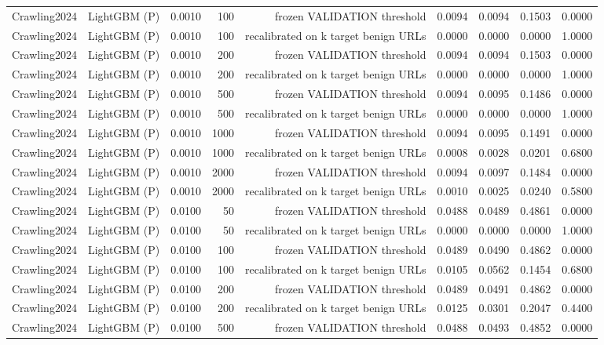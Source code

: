 \begin{table}[t]
\begin{tabular}{llrrrrrrr}
Crawling2024 & LightGBM (P) & 0.0010 & 100 & frozen VALIDATION threshold & 0.0094 & 0.0094 & 0.1503 & 0.0000 \\
Crawling2024 & LightGBM (P) & 0.0010 & 100 & recalibrated on k target benign URLs & 0.0000 & 0.0000 & 0.0000 & 1.0000 \\
Crawling2024 & LightGBM (P) & 0.0010 & 200 & frozen VALIDATION threshold & 0.0094 & 0.0094 & 0.1503 & 0.0000 \\
Crawling2024 & LightGBM (P) & 0.0010 & 200 & recalibrated on k target benign URLs & 0.0000 & 0.0000 & 0.0000 & 1.0000 \\
Crawling2024 & LightGBM (P) & 0.0010 & 500 & frozen VALIDATION threshold & 0.0094 & 0.0095 & 0.1486 & 0.0000 \\
Crawling2024 & LightGBM (P) & 0.0010 & 500 & recalibrated on k target benign URLs & 0.0000 & 0.0000 & 0.0000 & 1.0000 \\
Crawling2024 & LightGBM (P) & 0.0010 & 1000 & frozen VALIDATION threshold & 0.0094 & 0.0095 & 0.1491 & 0.0000 \\
Crawling2024 & LightGBM (P) & 0.0010 & 1000 & recalibrated on k target benign URLs & 0.0008 & 0.0028 & 0.0201 & 0.6800 \\
Crawling2024 & LightGBM (P) & 0.0010 & 2000 & frozen VALIDATION threshold & 0.0094 & 0.0097 & 0.1484 & 0.0000 \\
Crawling2024 & LightGBM (P) & 0.0010 & 2000 & recalibrated on k target benign URLs & 0.0010 & 0.0025 & 0.0240 & 0.5800 \\
Crawling2024 & LightGBM (P) & 0.0100 & 50 & frozen VALIDATION threshold & 0.0488 & 0.0489 & 0.4861 & 0.0000 \\
Crawling2024 & LightGBM (P) & 0.0100 & 50 & recalibrated on k target benign URLs & 0.0000 & 0.0000 & 0.0000 & 1.0000 \\
Crawling2024 & LightGBM (P) & 0.0100 & 100 & frozen VALIDATION threshold & 0.0489 & 0.0490 & 0.4862 & 0.0000 \\
Crawling2024 & LightGBM (P) & 0.0100 & 100 & recalibrated on k target benign URLs & 0.0105 & 0.0562 & 0.1454 & 0.6800 \\
Crawling2024 & LightGBM (P) & 0.0100 & 200 & frozen VALIDATION threshold & 0.0489 & 0.0491 & 0.4862 & 0.0000 \\
Crawling2024 & LightGBM (P) & 0.0100 & 200 & recalibrated on k target benign URLs & 0.0125 & 0.0301 & 0.2047 & 0.4400 \\
Crawling2024 & LightGBM (P) & 0.0100 & 500 & frozen VALIDATION threshold & 0.0488 & 0.0493 & 0.4852 & 0.0000 \\

\end{tabular}
\end{table}
